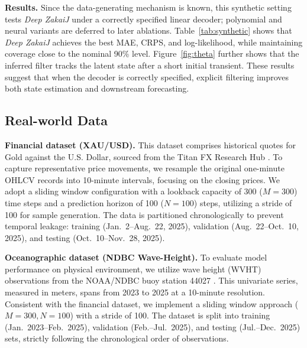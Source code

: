 \documentclass{article}
\begin{document}
\textbf{Results.}
Since the data-generating mechanism is known, this synthetic setting tests \textit{Deep ZakaiJ} under a correctly specified linear decoder; polynomial and neural variants are deferred to later ablations. Table~\ref{tab:synthetic} shows that \textit{Deep ZakaiJ} achieves the best MAE, CRPS, and log-likelihood, while maintaining coverage close to the nominal 90\% level. Figure~\ref{fig:theta} further shows that the inferred filter tracks the latent state after a short initial transient. These results suggest that when the decoder is correctly specified, explicit filtering improves both state estimation and downstream forecasting.

\subsection{Real-world Data}
\textbf{Financial dataset (XAU/USD).}
This dataset comprises historical quotes for Gold against the U.S. Dollar, sourced from the Titan FX Research Hub \cite{titanfx_xauusd_2025}. To capture representative price movements, we resample the original one-minute OHLCV records into 10-minute intervals, focusing on the closing prices. We adopt a sliding window configuration with a lookback capacity of 300 ($M=300$) time steps and a prediction horizon of 100 ($N=100$) steps, utilizing a stride of 100 for sample generation. The data is partitioned chronologically to prevent temporal leakage: training (Jan.~2--Aug.~22, 2025), validation (Aug.~22--Oct.~10, 2025), and testing (Oct.~10--Nov.~28, 2025).

\textbf{Oceanographic dataset (NDBC Wave-Height).}
To evaluate model performance on physical environment, we utilize wave height (WVHT) observations from the NOAA/NDBC buoy station 44027 \cite{ndbc_44027_wvht_2023_2025}. This univariate series, measured in meters, spans from 2023 to 2025 at a 10-minute resolution. Consistent with the financial dataset, we implement a sliding window approach ($M=300, N=100$) with a stride of 100. The dataset is split into training (Jan.~2023--Feb.~2025), validation (Feb.--Jul.~2025), and testing (Jul.--Dec.~2025) sets, strictly following the chronological order of observations.
\end{document}
